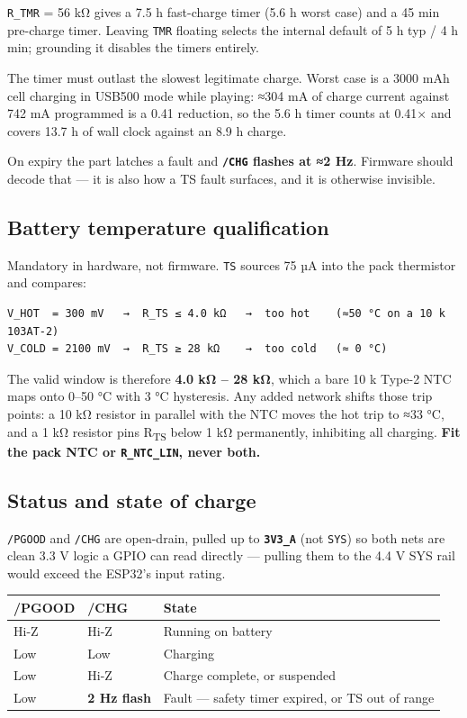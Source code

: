 \documentclass[11pt]{article}
\begin{document}
\texttt{R_TMR} = 56 kΩ gives a 7.5 h fast-charge timer (5.6 h worst case) and a 45 min pre-charge
timer. Leaving \texttt{TMR} floating selects the internal default of 5 h typ / 4 h min; grounding it
disables the timers entirely.

The timer must outlast the slowest legitimate charge. Worst case is a 3000 mAh cell charging in
USB500 mode while playing: ≈304 mA of charge current against 742 mA programmed is a 0.41 reduction,
so the 5.6 h timer counts at 0.41× and covers 13.7 h of wall clock against an 8.9 h charge.

On expiry the part latches a fault and \textbf{\texttt{/CHG} flashes at ≈2 Hz}. Firmware should
decode that — it is also how a TS fault surfaces, and it is otherwise invisible.

\subsection{Battery temperature qualification}

Mandatory in hardware, not firmware. \texttt{TS} sources 75 µA into the pack thermistor and compares:

\begin{Verbatim}
V_HOT  = 300 mV   →  R_TS ≤ 4.0 kΩ   →  too hot    (≈50 °C on a 10 k 103AT-2)
V_COLD = 2100 mV  →  R_TS ≥ 28 kΩ    →  too cold   (≈ 0 °C)
\end{Verbatim}

The valid window is therefore \textbf{4.0 kΩ – 28 kΩ}, which a bare 10 k Type-2 NTC maps onto
0–50 °C with 3 °C hysteresis. Any added network shifts those trip points: a 10 kΩ resistor in
parallel with the NTC moves the hot trip to ≈33 °C, and a 1 kΩ resistor pins R\textsubscript{TS}
below 1 kΩ permanently, inhibiting all charging. \textbf{Fit the pack NTC or \texttt{R_NTC_LIN},
never both.}

\subsection{Status and state of charge}

\texttt{/PGOOD} and \texttt{/CHG} are open-drain, pulled up to \textbf{\texttt{3V3_A}} (not
\texttt{SYS}) so both nets are clean 3.3 V logic a GPIO can read directly — pulling them to the 4.4 V
SYS rail would exceed the ESP32's input rating.

\begin{tabularx}{\linewidth}{@{}l l X@{}}
\toprule
\textbf{/PGOOD} & \textbf{/CHG} & \textbf{State} \\
\midrule
Hi-Z & Hi-Z & Running on battery \\
Low & Low & Charging \\
Low & Hi-Z & Charge complete, or suspended \\
Low & \textbf{2 Hz flash} & Fault — safety timer expired, or TS out of range \\
\bottomrule
\end{tabularx}
\end{document}
